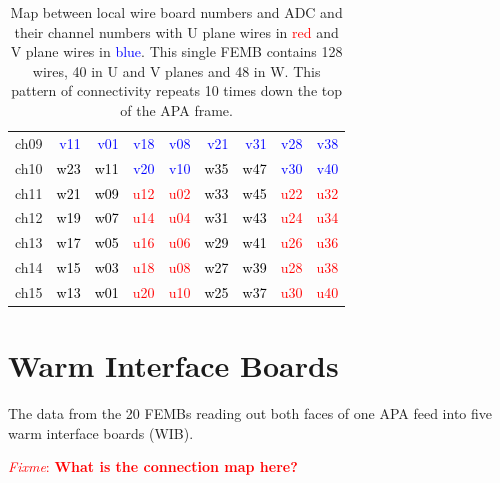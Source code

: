 \documentclass[pdftex,12pt,letter]{article}
\newcommand{\fixme}[1]{\textcolor{red}{\textit{Fixme}: \textbf{#1}}}
\begin{document}
\begin{table}[htp]
\begin{tabular}{r|rrrrrrrr}
ch09 & \textcolor{blue}{v11} & \textcolor{blue}{v01} & \textcolor{blue}{v18} & \textcolor{blue}{v08} & \textcolor{blue}{v21} & \textcolor{blue}{v31} & \textcolor{blue}{v28} & \textcolor{blue}{v38}\\
ch10 & \textcolor{black}{w23} & \textcolor{black}{w11} & \textcolor{blue}{v20} & \textcolor{blue}{v10} & \textcolor{black}{w35} & \textcolor{black}{w47} & \textcolor{blue}{v30} & \textcolor{blue}{v40}\\
ch11 & \textcolor{black}{w21} & \textcolor{black}{w09} & \textcolor{red}{u12} & \textcolor{red}{u02} & \textcolor{black}{w33} & \textcolor{black}{w45} & \textcolor{red}{u22} & \textcolor{red}{u32}\\
ch12 & \textcolor{black}{w19} & \textcolor{black}{w07} & \textcolor{red}{u14} & \textcolor{red}{u04} & \textcolor{black}{w31} & \textcolor{black}{w43} & \textcolor{red}{u24} & \textcolor{red}{u34}\\
ch13 & \textcolor{black}{w17} & \textcolor{black}{w05} & \textcolor{red}{u16} & \textcolor{red}{u06} & \textcolor{black}{w29} & \textcolor{black}{w41} & \textcolor{red}{u26} & \textcolor{red}{u36}\\
ch14 & \textcolor{black}{w15} & \textcolor{black}{w03} & \textcolor{red}{u18} & \textcolor{red}{u08} & \textcolor{black}{w27} & \textcolor{black}{w39} & \textcolor{red}{u28} & \textcolor{red}{u38}\\
ch15 & \textcolor{black}{w13} & \textcolor{black}{w01} & \textcolor{red}{u20} & \textcolor{red}{u10} & \textcolor{black}{w25} & \textcolor{black}{w37} & \textcolor{red}{u30} & \textcolor{red}{u40}\\
\hline
\end{tabular}


  \caption{Map between local wire board numbers and ADC and their channel numbers with U plane wires in \textcolor{red}{red} and V plane wires in \textcolor{blue}{blue}.  This single FEMB contains 128 wires, 40 in U and V planes and 48 in W.  This pattern of connectivity repeats 10 times down the top of the APA frame.}
\end{table}

\section{Warm Interface Boards}

The data from the 20 FEMBs reading out both faces of one APA feed into
five warm interface boards (WIB).

\fixme{What is the connection map here?}
\end{document}
